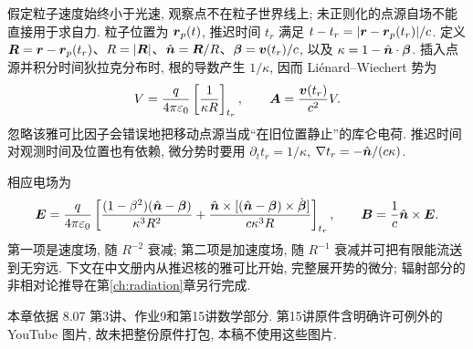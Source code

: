 假定粒子速度始终小于光速, 观察点不在粒子世界线上; 未正则化的点源自场不能直接用于求自力. 粒子位置为 $\boldsymbol{r}_p(t)$, 推迟时间 $t_r$ 满足 $t-t_r=|\boldsymbol{r}-\boldsymbol{r}_p(t_r)|/c$. 定义 $\boldsymbol{R}=\boldsymbol{r}-\boldsymbol{r}_p(t_r)$、$R=|\boldsymbol{R}|$、$\hat{\boldsymbol{n}}=\boldsymbol{R}/R$、$\boldsymbol{\beta}=\boldsymbol{v}(t_r)/c$, 以及 $\kappa=1-\hat{\boldsymbol{n}}\cdot\boldsymbol{\beta}$. 插入点源并积分时间狄拉克分布时, 根的导数产生 $1/\kappa$, 因而 Li\'enard--Wiechert 势为
\[
V=\frac q{4\pi\varepsilon_0}\left[\frac1{\kappa R}\right]_{t_r},\qquad
\boldsymbol{A}=\frac{\boldsymbol{v}(t_r)}{c^2}V.
\]
忽略该雅可比因子会错误地把移动点源当成“在旧位置静止”的库仑电荷. 推迟时间对观测时间及位置也有依赖, 微分势时要用 $\partial_t t_r=1/\kappa$, $\nabla t_r=-\hat{\boldsymbol{n}}/(c\kappa)$.

相应电场为
\begin{align*}
\boldsymbol{E}=\frac q{4\pi\varepsilon_0}\left[
\frac{(1-\beta^2)(\hat{\boldsymbol{n}}-\boldsymbol{\beta})}{\kappa^3R^2}
+\frac{\hat{\boldsymbol{n}}\times[(\hat{\boldsymbol{n}}-\boldsymbol{\beta})\times\dot{\boldsymbol{\beta}}]}{c\kappa^3R}
\right]_{t_r},\qquad
\boldsymbol{B}=\frac1c\hat{\boldsymbol{n}}\times\boldsymbol{E}.
\end{align*}
第一项是速度场, 随 $R^{-2}$ 衰减; 第二项是加速度场, 随 $R^{-1}$ 衰减并可把有限能流送到无穷远. 下文在中文册内从推迟核的雅可比开始, 完整展开势的微分; 辐射部分的非相对论推导在第\ref{ch:radiation}章另行完成.



本章依据 8.07 第3讲、作业9和第15讲数学部分. 第15讲原件含明确许可例外的 YouTube 图片, 故未把整份原件打包, 本稿不使用这些图片.
